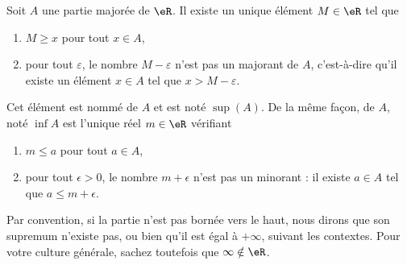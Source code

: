 \begin{propositionDef}		\label{DefSupeA}
	Soit \( A\) une partie majorée de \( \eR\). Il existe un unique élément \( M\in \eR\) tel que
	\begin{enumerate}
		\item
		      \( M\geq x\) pour tout \( x\in A\),
		\item
		      pour tout \( \varepsilon\), le nombre \( M-\varepsilon\) n'est pas un majorant de \( A\), c'est-à-dire qu'il existe un élément \( x\in A\) tel que \( x>M-\varepsilon\).
	\end{enumerate}

	Cet élément est nommé  de \( A\) et est noté \( \sup(A)\). De la même façon,  de \( A\), noté \( \inf A\) est l'unique réel \( m\in\eR\) vérifiant
	\begin{enumerate}
		\item
		      \( m\leq a\) pour tout \( a\in A\),
		\item
		      pour tout \( \epsilon>0\), le nombre \( m+\epsilon\) n'est pas un minorant : il existe \( a\in A\) tel que \( a\leq m+\epsilon\).
	\end{enumerate}
\end{propositionDef}

Par convention, si la partie n'est pas bornée vers le haut, nous dirons que son supremum n'existe pas, ou bien qu'il est égal à \( +\infty\), suivant les contextes. Pour votre culture générale, sachez toutefois que \( \infty\notin\eR\).

